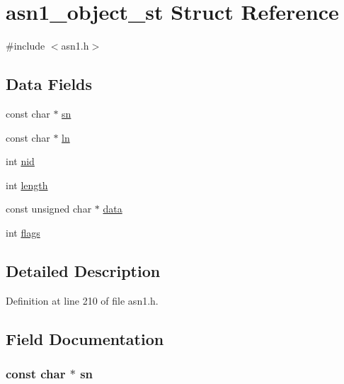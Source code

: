 \hypertarget{structasn1__object__st}{}\section{asn1\+\_\+object\+\_\+st Struct Reference}
\label{structasn1__object__st}


{\ttfamily \#include $<$asn1.\+h$>$}

\subsection*{Data Fields}
\begin{DoxyCompactItemize}
\item 
const char $\ast$ \hyperlink{structasn1__object__st_ae00fa06fcc021cd0d6d6f8a93a58a7ab}{sn}
\item 
const char $\ast$ \hyperlink{structasn1__object__st_ac3d72435ebf187f1efd1359b6d795146}{ln}
\item 
int \hyperlink{structasn1__object__st_a7235ef62e89328f5155846dc59c6fc37}{nid}
\item 
int \hyperlink{structasn1__object__st_a9f59b34b1f25fe00023291b678246bcc}{length}
\item 
const unsigned char $\ast$ \hyperlink{structasn1__object__st_af156252eef84b50be6ae26b0b9ad3dae}{data}
\item 
int \hyperlink{structasn1__object__st_ac8bf36fe0577cba66bccda3a6f7e80a4}{flags}
\end{DoxyCompactItemize}


\subsection{Detailed Description}


Definition at line 210 of file asn1.\+h.



\subsection{Field Documentation}
\subsubsection[{\texorpdfstring{sn}{sn}}]{\setlength{\rightskip}{0pt plus 5cm}const char $\ast$ sn}\hypertarget{structasn1__object__st_ae00fa06fcc021cd0d6d6f8a93a58a7ab}{}\label{structasn1__object__st_ae00fa06fcc021cd0d6d6f8a93a58a7ab}


